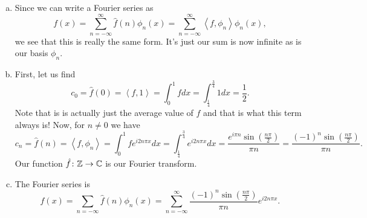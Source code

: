 \documentclass[12pt]{article} %
\newcommand{\innprod}[2]{\left\langle #1, #2\right\rangle}
\begin{document}
\begin{solution}
\begin{enumerate}[(a)]
\item Since we can write a Fourier series as
\[
f(x) = \sum_{n=-\infty}^\infty \hat{f}(n) \phi_n(x) = \sum_{n=-\infty}^\infty \innprod{f}{\phi_n} \phi_n(x),
\]
we see that this is really the same form. It's just our sum is now infinite as is our basis $\phi_n$.
\item First, let us find 
\[
c_0 = \hat{f}(0) = \innprod{f}{1} = \int_0^1 f dx = \int_\frac{1}{4}^\frac{3}{4} 1 dx = \frac{1}{2}.
\]
Note that is is actually just the average value of $f$ and that is what this term always is! Now, for $n\neq 0$ we have
\[
c_n = \hat{f}(n) = \innprod{f}{\phi_n} = \int_0^1 f e^{i2n\pi x} dx = \int_\frac{1}{4}^\frac{3}{4} e^{i2n\pi x} dx = \frac{e^{i \pi n}\sin\left(\frac{n \pi}{2}\right)}{\pi n} = \frac{(-1)^n\sin\left(\frac{n \pi}{2}\right) }{\pi n}.
\]
Our function $\hat{f} \colon \mathbb{Z} \to \mathbb{C}$ is our Fourier transform.

\item The Fourier series is 
\[
f(x) = \sum_{n=-\infty} \hat{f}(n) \phi_n(x) = \sum_{n=-\infty}^\infty  \frac{(-1)^n\sin\left(\frac{n \pi}{2}\right) }{\pi n} e^{i2n\pi x}.
\]


\end{enumerate}
\end{solution}
\end{document}
